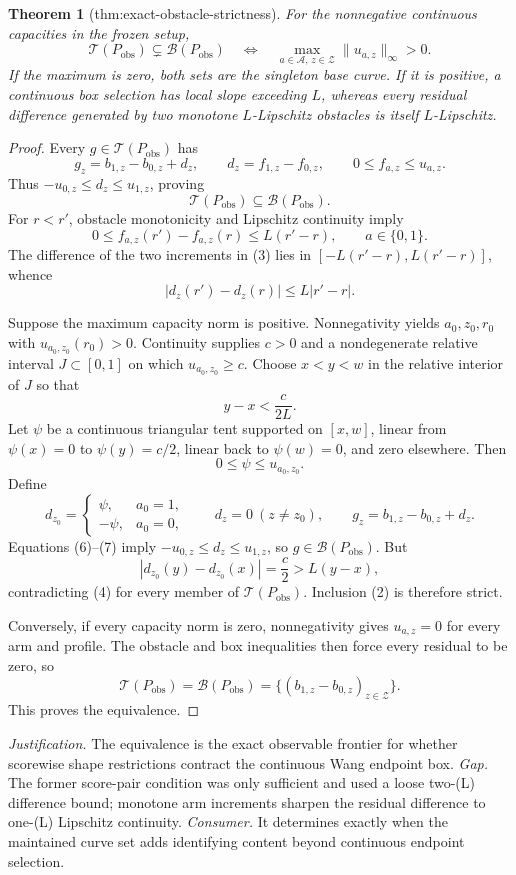 \documentclass{article}
\newtheorem{theorem}{Theorem}
\begin{document}
\begin{theorem}[thm:exact-obstacle-strictness]\label{thm:exact-obstacle-strictness}
For the nonnegative continuous capacities in the frozen setup,
\[
\mathcal T(P_{\mathrm{obs}})\subsetneq\mathcal B(P_{\mathrm{obs}})
\quad\Longleftrightarrow\quad
\max_{a\in\mathcal A,\,z\in\mathcal Z}\|u_{a,z}\|_\infty>0.
\]
If the maximum is zero, both sets are the singleton base curve.  If it is positive, a continuous box selection has local slope exceeding \(L\), whereas every residual difference generated by two monotone \(L\)-Lipschitz obstacles is itself \(L\)-Lipschitz.
\end{theorem}
\begin{proof}
Every \(g\in\mathcal T(P_{\mathrm{obs}})\) has
\[
g_z=b_{1,z}-b_{0,z}+d_z,\qquad
d_z=f_{1,z}-f_{0,z},\qquad
0\leq f_{a,z}\leq u_{a,z}.
\tag{1}
\]
Thus \(-u_{0,z}\leq d_z\leq u_{1,z}\), proving
\[
\mathcal T(P_{\mathrm{obs}})\subseteq\mathcal B(P_{\mathrm{obs}}).
\tag{2}
\]
For \(r<r'\), obstacle monotonicity and Lipschitz continuity imply
\[
0\leq f_{a,z}(r')-f_{a,z}(r)\leq L(r'-r),\qquad a\in\{0,1\}.
\tag{3}
\]
The difference of the two increments in (3) lies in \([-L(r'-r),L(r'-r)]\), whence
\[
|d_z(r')-d_z(r)|\leq L|r'-r|.
\tag{4}
\]

Suppose the maximum capacity norm is positive.  Nonnegativity yields \(a_0,z_0,r_0\) with \(u_{a_0,z_0}(r_0)>0\).  Continuity supplies \(c>0\) and a nondegenerate relative interval \(J\subset[0,1]\) on which \(u_{a_0,z_0}\geq c\).  Choose \(x<y<w\) in the relative interior of \(J\) so that
\[
y-x<\frac{c}{2L}.
\tag{5}
\]
Let \(\psi\) be a continuous triangular tent supported on \([x,w]\), linear from \(\psi(x)=0\) to \(\psi(y)=c/2\), linear back to \(\psi(w)=0\), and zero elsewhere.  Then
\[
0\leq\psi\leq u_{a_0,z_0}.
\tag{6}
\]
Define
\[
d_{z_0}=
\begin{cases}
\psi,&a_0=1,\\
-\psi,&a_0=0,
\end{cases}
\qquad
d_z=0\ (z\neq z_0),\qquad
g_z=b_{1,z}-b_{0,z}+d_z.
\tag{7}
\]
Equations (6)--(7) imply \(-u_{0,z}\leq d_z\leq u_{1,z}\), so \(g\in\mathcal B(P_{\mathrm{obs}})\).  But
\[
|d_{z_0}(y)-d_{z_0}(x)|=\frac c2>L(y-x),
\tag{8}
\]
contradicting (4) for every member of \(\mathcal T(P_{\mathrm{obs}})\).  Inclusion (2) is therefore strict.

Conversely, if every capacity norm is zero, nonnegativity gives \(u_{a,z}=0\) for every arm and profile.  The obstacle and box inequalities then force every residual to be zero, so
\[
\mathcal T(P_{\mathrm{obs}})
=\mathcal B(P_{\mathrm{obs}})
=\{(b_{1,z}-b_{0,z})_{z\in\mathcal Z}\}.
\]
This proves the equivalence.
\end{proof}
\par\smallskip\noindent \textit{Justification.} The equivalence is the exact observable frontier for whether scorewise shape restrictions contract the continuous Wang endpoint box. \textit{Gap.} The former score-pair condition was only sufficient and used a loose two-(L) difference bound; monotone arm increments sharpen the residual difference to one-(L) Lipschitz continuity. \textit{Consumer.} It determines exactly when the maintained curve set adds identifying content beyond continuous endpoint selection.
\end{document}
